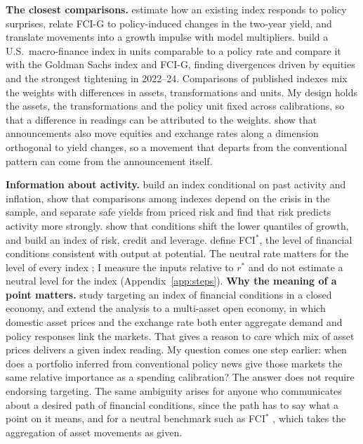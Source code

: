 \documentclass[11pt]{article}
\newcommand{\rs}{r^{*}}
\begin{document}
\textbf{The closest comparisons.} \citet{arnaut2024} estimate how an existing index responds to policy surprises, \citet{sack2023} relate FCI-G to policy-induced changes in the two-year yield, and \citet{ajello2023} translate movements into a growth impulse with model multipliers. \citet{bletzinger2026} build a U.S.\ macro-finance index in units comparable to a policy rate and compare it with the Goldman Sachs index and FCI-G, finding divergences driven by equities and the strongest tightening in 2022--24. Comparisons of published indexes mix the weights with differences in assets, transformations and units. My design holds the assets, the transformations and the policy unit fixed across calibrations, so that a difference in readings can be attributed to the weights. \citet{boehm2025} show that announcements also move equities and exchange rates along a dimension orthogonal to yield changes, so a movement that departs from the conventional pattern can come from the announcement itself.

\textbf{Information about activity.} \citet{hatzius2010} build an index conditional on past activity and inflation, \citet{aramonte2013} show that comparisons among indexes depend on the crisis in the sample, and \citet{lombardi2025} separate safe yields from priced risk and find that risk predicts activity more strongly. \citet{adrian2019} show that conditions shift the lower quantiles of growth, and \citet{brave2011} build an index of risk, credit and leverage. \citet{caballero2026} define FCI$^*$, the level of financial conditions consistent with output at potential. The neutral rate matters for the level of every index \citep{laubach2003,holston2017,holston2023,hamilton2016,bauer2020,kiley2020}; I measure the inputs relative to $\rs$ and do not estimate a neutral level for the index (Appendix~\ref{app:steps}).
\textbf{Why the meaning of a point matters.} \citet{caballero2024} study targeting an index of financial conditions in a closed economy, and \citet{caballero2026b} extend the analysis to a multi-asset open economy, in which domestic asset prices and the exchange rate both enter aggregate demand and policy responses link the markets. That gives a reason to care which mix of asset prices delivers a given index reading. My question comes one step earlier: when does a portfolio inferred from conventional policy news give those markets the same relative importance as a spending calibration? The answer does not require endorsing targeting. The same ambiguity arises for anyone who communicates about a desired path of financial conditions, since the path has to say what a point on it means, and for a neutral benchmark such as FCI$^*$ \citep{caballero2026}, which takes the aggregation of asset movements as given.
\FloatBarrier
\end{document}
